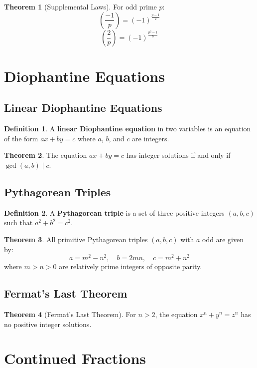\documentclass[11pt]{article}
\theoremstyle{definition}
\newtheorem{definition}{Definition}[section]
\newtheorem{theorem}{Theorem}[section]
\begin{document}
\begin{theorem}[Supplemental Laws]
For odd prime $p$:
$$\left(\frac{-1}{p}\right) = (-1)^{\frac{p-1}{2}}$$
$$\left(\frac{2}{p}\right) = (-1)^{\frac{p^2-1}{8}}$$
\end{theorem}

\section{Diophantine Equations}

\subsection{Linear Diophantine Equations}
\begin{definition}
A \textbf{linear Diophantine equation} in two variables is an equation of the form $ax + by = c$ where $a$, $b$, and $c$ are integers.
\end{definition}

\begin{theorem}
The equation $ax + by = c$ has integer solutions if and only if $\gcd(a,b) \mid c$.
\end{theorem}

\subsection{Pythagorean Triples}
\begin{definition}
A \textbf{Pythagorean triple} is a set of three positive integers $(a,b,c)$ such that $a^2 + b^2 = c^2$.
\end{definition}

\begin{theorem}
All primitive Pythagorean triples $(a,b,c)$ with $a$ odd are given by:
$$a = m^2 - n^2, \quad b = 2mn, \quad c = m^2 + n^2$$
where $m > n > 0$ are relatively prime integers of opposite parity.
\end{theorem}

\subsection{Fermat's Last Theorem}
\begin{theorem}[Fermat's Last Theorem]
For $n > 2$, the equation $x^n + y^n = z^n$ has no positive integer solutions.
\end{theorem}

\section{Continued Fractions}
\end{document}
